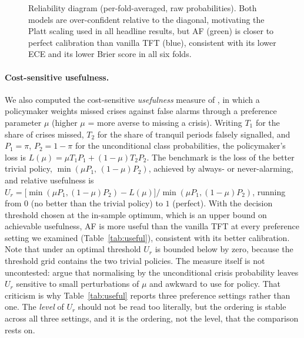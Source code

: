 \documentclass[11pt,a4paper]{article}
\begin{document}
\begin{figure}[h]
\centering
{}
\caption{Reliability diagram (per-fold-averaged, raw probabilities). Both
models are over-confident relative to the diagonal, motivating the Platt
scaling used in all headline results, but AF (green) is closer to perfect
calibration than vanilla TFT (blue), consistent with its lower ECE and its
lower Brier score in all six folds.}
\label{fig:reliability}
\end{figure}

\paragraph{Cost-sensitive usefulness.} We also computed the cost-sensitive
\emph{usefulness} measure of \citet{sarlin2013biggest}, in which a policymaker
weights missed crises against false alarms through a preference parameter
$\mu$ (higher $\mu$ = more averse to missing a crisis). Writing $T_1$ for the
share of crises missed, $T_2$ for the share of tranquil periods falsely
signalled, and $P_1=\pi$, $P_2=1-\pi$ for the unconditional class
probabilities, the policymaker's loss is
$L(\mu)=\mu T_1 P_1+(1-\mu)T_2 P_2$. The benchmark is the loss of the better
trivial policy, $\min(\mu P_1,\,(1-\mu)P_2)$, achieved by always- or
never-alarming, and relative usefulness is
$U_r=\bigl[\min(\mu P_1,(1-\mu)P_2)-L(\mu)\bigr]/\min(\mu P_1,(1-\mu)P_2)$,
running from $0$ (no better than the trivial policy) to $1$ (perfect). With
the decision threshold chosen at the in-sample optimum, which is an upper bound
on achievable usefulness, AF is more useful than the vanilla TFT at every
preference setting we examined (Table~\ref{tab:useful}), consistent with its
better calibration. Note that under an optimal threshold $U_r$ is bounded below
by zero, because the threshold grid contains the two trivial policies. The
measure itself is not uncontested: \citet{alessidetken2014comment} argue that
normalising by the unconditional crisis probability leaves $U_r$ sensitive to
small perturbations of $\mu$ and awkward to use for policy. That criticism is
why Table~\ref{tab:useful} reports three preference settings rather than one.
The \emph{level} of $U_r$ should not be read too literally, but the ordering is
stable across all three settings, and it is the ordering, not the level, that
the comparison rests on.
\end{document}
